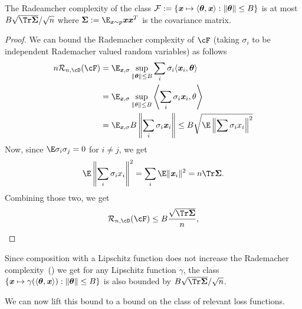 \begin{lemma}
\label{lem:rademacher-linear}
     The Radeamcher complexity of the class $\mathcal{F} := \{ \boldsymbol{\mathit{x}} \mapsto \langle \boldsymbol{\theta}, \boldsymbol{\mathit{x}} \rangle : \|\boldsymbol{\theta}\| \leq B \}$ is at most
    $B \sqrt{\Tr \boldsymbol{\Sigma}}/\sqrt{n}$ where $\boldsymbol{\Sigma} := \E_{\xx \sim p} \xx \xx^T$ is the covariance matrix.
\end{lemma}
\begin{proof}
  We can bound the Rademacher complexity of $\cF$ (taking $\sigma_i$ to be independent Rademacher valued random variables) as follows
    \begin{align*}
        n \mathcal{R}_{n, \cD}(\cF) & =\E_{\xx, \sigma} \sup_{\|\boldsymbol{\theta}\| \leq B} \sum_i \sigma_i \langle \xx_i, \boldsymbol{\theta} \rangle \\
        & = \E_{\xx, \sigma} \sup_{\|\theta\| \leq B} \left\langle \sum_i \sigma_i \xx_i, \theta \right\rangle \\
        & = \E_{\xx, \sigma} B \left\|\sum_i \sigma_i \xx_i \right\| \leq B \sqrt{\E\left\|\sum \sigma_i x_i\right\|^2}
    \end{align*}
    Now, since $\E \sigma_i \sigma_j = 0$ for $i\not=j$, we get
    \begin{align*}
    \E \left\|\sum_i \sigma_i x_i \right\|^2 =\sum_i \E \|\xx_i\|^2 = n \Tr \boldsymbol{\Sigma}.
    \end{align*}
    Combining those two, we get
    \begin{equation*}
        \mathcal{R}_{n, \cD}(\cF) \leq B \frac{\sqrt{\Tr \boldsymbol{\Sigma}}}{n},
    \end{equation*}
\end{proof}
Since composition with a Lipschitz function does not increase the Rademacher complexity~() we get for any Lipschitz function $\gamma$, the class $\{ \boldsymbol{\mathit{x}} \mapsto \gamma(\langle \boldsymbol{\theta}, \boldsymbol{\mathit{x}}\rangle) : \|\boldsymbol{\theta}\| \leq B\}$ is also bounded by $B \sqrt{\Tr \boldsymbol{\Sigma}} / \sqrt{n}$.

We can now lift this bound to a bound on the class of relevant loss functions.

